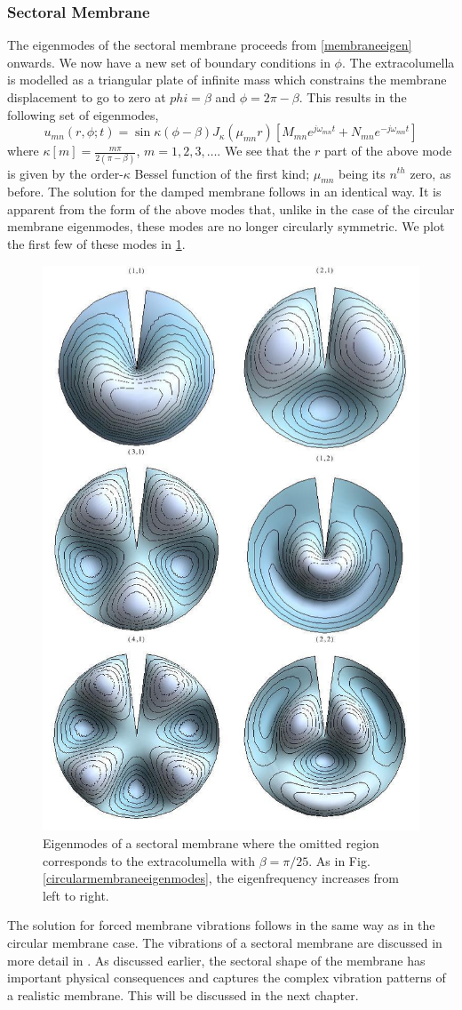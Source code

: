 \subsubsection{Sectoral Membrane}
The eigenmodes of the sectoral membrane proceeds from \eqref{membraneeigen} onwards. We now have a new set of boundary conditions in $\phi$.
The extracolumella is modelled as a triangular plate of infinite mass which constrains the membrane displacement to go to zero at $phi=\beta$
and $\phi=2\pi-\beta$. This results in the following set of eigenmodes,
\begin{equation}\label{sectoraleigenmode}
 u_{mn}(r,\phi;t)=\sin \kappa(\phi-\beta) J_\kappa(\mu_{mn} r)\left[M_{mn}e^{j\omega_{mn} t}+N_{mn}e^{-j\omega_{mn} t}\right]
\end{equation}
where $\kappa[m]=\frac{m\pi}{2(\pi-\beta)}$, $m=1,2,3,\ldots$. We see that the $r$ part of the above mode is given by the
order-$\kappa$ Bessel function of the first kind; $\mu_{mn}$ being its $n^{th}$ zero, as before. The solution for the damped
membrane follows in an identical way.
It is apparent from the form of the above modes that, unlike in the case of the circular membrane eigenmodes, these modes
are no longer circularly symmetric. We plot the first few of these modes in \ref{sectoralmembraneeigenmodes}. 
\begin{figure}[ht!]
 \centering
 \includegraphics[width=.6\linewidth]{Diagrams/SectorMembraneModes/membrane_modes_all.png}
 \caption[Sectoral membrane eigenmodes]{Eigenmodes of a sectoral membrane where the omitted region corresponds to the extracolumella with $\beta=\pi/25$. As in Fig. \ref{circularmembraneeigenmodes}, the eigenfrequency increases from left to right.}
  \label{sectoralmembraneeigenmodes}
\end{figure}
The solution for forced membrane vibrations follows in the same way as in the circular membrane case. The vibrations of a sectoral membrane
are discussed in more detail in \cite[p.~87]{fletcheracoustic}. As discussed earlier, the sectoral shape of the membrane has important
physical consequences and captures the complex vibration patterns of a realistic membrane. This will be discussed in the next chapter.
